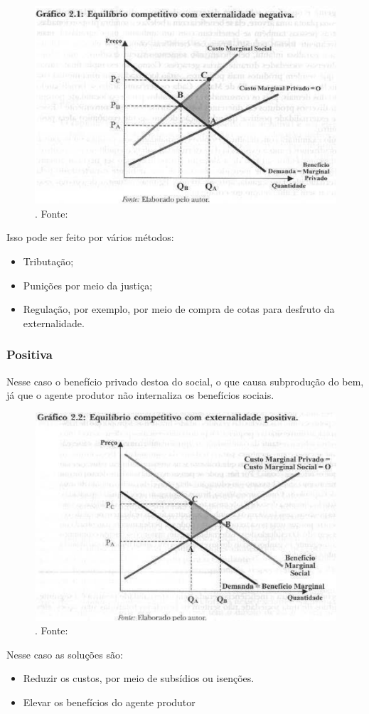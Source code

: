 \documentclass[12pt,a4paper,oneside,brazil]{abntex2}
\begin{document}
\begin{figure}[ht]
\includegraphics[scale=0.7]{Externalidade Negativa.png}
\centering
\caption{. Fonte: \cite{biderman}}
\end{figure}

Isso pode ser feito por vários métodos:
\begin{itemize}
\item Tributação;
\item Punições por meio da justiça;
\item  Regulação, por exemplo, por meio de compra de cotas para desfruto da externalidade.
\end{itemize}
\subsubsection{Positiva}
Nesse caso o benefício privado destoa do social, o que causa subprodução do bem, já que o agente produtor não internaliza os benefícios sociais.
\begin{figure}[ht]
\includegraphics[scale=0.7]{Externalidade Positiva.png}
\centering
\caption{. Fonte: \cite{biderman}}
\end{figure}
Nesse caso as soluções são:
\begin{itemize}
\item Reduzir os custos, por meio de subsídios ou isenções.
\item Elevar os benefícios do agente produtor
\end{itemize}
\end{document}
